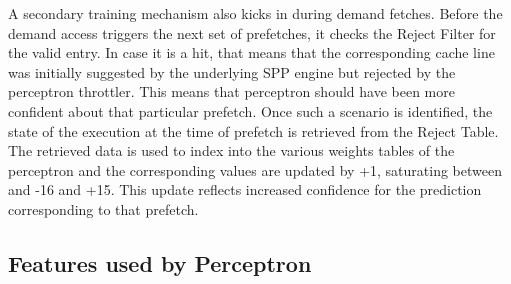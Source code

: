 \documentclass{sig-alternate}
\begin{document}
A secondary training mechanism also kicks in during demand fetches. 
Before the demand access triggers the next set of prefetches, it checks the Reject Filter for the valid entry. 
In case it is a hit, that means that the corresponding cache line was initially suggested by the underlying SPP engine but rejected by the perceptron throttler. 
This means that perceptron should have been more confident about that particular prefetch. 
Once such a scenario is identified, the state of the execution at the time of prefetch is retrieved from the Reject Table. 
The retrieved data is used to index into the various weights tables of the perceptron and the corresponding values are updated by +1, saturating between and -16 and +15. 
This update reflects increased confidence for the prediction corresponding to that prefetch.  

\subsection{Features used by Perceptron}
\end{document}
